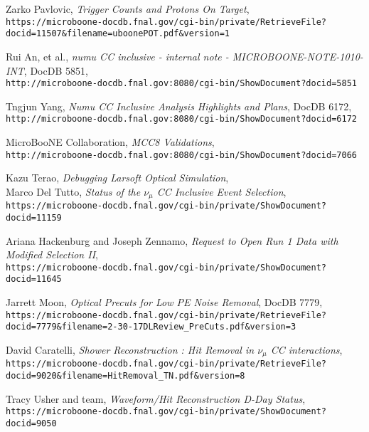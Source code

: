 \begin{thebibliography}{20}
  Zarko Pavlovic, \emph{Trigger Counts and Protons On Target},\\
  \texttt{https://microboone-docdb.fnal.gov/cgi-bin/private/RetrieveFile?docid=11507\&filename=uboonePOT.pdf\&version=1}

  Rui An, et al., \emph{numu CC inclusive - internal note - MICROBOONE-NOTE-1010-INT}, DocDB 5851,\\
  \texttt{http://microboone-docdb.fnal.gov:8080/cgi-bin/ShowDocument?docid=5851}
 
  Tngjun Yang, \emph{Numu CC Inclusive Analysis Highlights and Plans}, DocDB 6172,\\
  \texttt{http://microboone-docdb.fnal.gov:8080/cgi-bin/ShowDocument?docid=6172}

 MicroBooNE Collaboration, \emph{MCC8 Validations},\\
 \texttt{http://microboone-docdb.fnal.gov:8080/cgi-bin/ShowDocument?docid=7066}

 Kazu Terao, \emph{Debugging Larsoft Optical Simulation},\\

 Marco Del Tutto, \emph{Status of the $\nu_\mu$ CC
Inclusive Event Selection},\\
 \texttt{https://microboone-docdb.fnal.gov/cgi-bin/private/ShowDocument?docid=11159}

 Ariana Hackenburg and Joseph Zennamo, \emph{Request to Open Run 1 Data with Modified Selection II},\\
 \texttt{https://microboone-docdb.fnal.gov/cgi-bin/private/ShowDocument?docid=11645}
 
  Jarrett Moon, \emph{Optical Precuts for
Low PE Noise Removal}, DocDB 7779,\\
\texttt{https://microboone-docdb.fnal.gov/cgi-bin/private/RetrieveFile?docid=7779\&filename=2-30-17DLReview\_PreCuts.pdf\&version=3}

  David Caratelli, \emph{Shower Reconstruction : Hit Removal in $\nu_{\mu}$ CC interactions},\\
  \texttt{https://microboone-docdb.fnal.gov/cgi-bin/private/RetrieveFile?docid=9020\&filename=HitRemoval\_TN.pdf\&version=8}

  Tracy Usher and team, \emph{Waveform/Hit Reconstruction D-Day Status},\\
  \texttt{https://microboone-docdb.fnal.gov/cgi-bin/private/ShowDocument?docid=9050}


\end{thebibliography}
